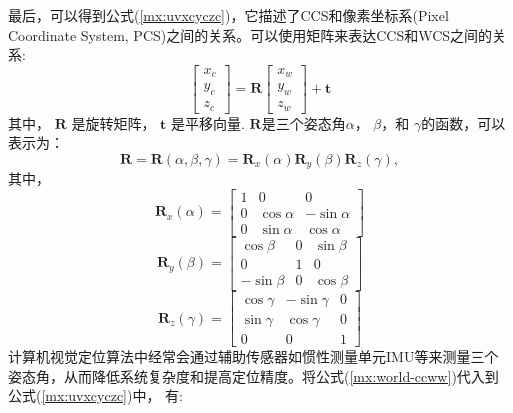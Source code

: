 最后，可以得到公式(\ref{mx:uvxcyczc})，它描述了CCS和像素坐标系(Pixel Coordinate System, PCS)之间的关系。可以使用矩阵来表达CCS和WCS之间的关系:
\begin{equation}\label{mx:world-ccww}
  \begin{bmatrix}
    x_{c}\\
    y_{c}\\
   z_{c}
   \end{bmatrix}
   =\mathbf{R}
   \begin{bmatrix}
    x_{w}\\
    y_{w}\\
   z_{w}
   \end{bmatrix}
   +\mathbf{t}
\end{equation}
其中， $\mathbf{R}$ 是旋转矩阵， $\mathbf{t}$ 是平移向量. $\mathbf{R}$是三个姿态角$\alpha$， $\beta$，和 $\gamma$的函数，可以表示为：
  \begin{equation}\label{eq:R}
    \mathbf{R}=\mathbf{R}(\alpha , \beta , \gamma)=\mathbf{R}_{x}(\alpha)\mathbf{R}_{y}(\beta)\mathbf{R}_{z}(\gamma),
  \end{equation}
其中，
  \begin{equation}\label{eq:Ra}
  \mathbf{R}_{x}(\alpha)=\begin{bmatrix}
    1 &0  &0 \\
    0 & \cos\alpha  &-\sin\alpha  \\
     0 & \sin\alpha  &\cos\alpha 
   \end{bmatrix}
  \end{equation}
   \begin{equation}\label{eq:Rb}
    \mathbf{R}_{y}(\beta)=\begin{bmatrix}
      \cos\beta &0  &\sin\beta \\
      0 & 1  &0  \\
       -\sin\beta&0  &\cos\beta 
     \end{bmatrix}
  \end{equation}
  \begin{equation}\label{eq:Rc}
    \mathbf{R}_{z}(\gamma)=\begin{bmatrix}
      \cos\gamma  &-\sin\gamma &0 \\
      \sin\gamma & \cos\gamma  &0  \\
       0&0  &1
     \end{bmatrix}
  \end{equation}
计算机视觉定位算法中经常会通过辅助传感器如惯性测量单元IMU等来测量三个姿态角，从而降低系统复杂度和提高定位精度。将公式(\ref{mx:world-ccww})代入到公式(\ref{mx:uvxcyczc})中， 有:
